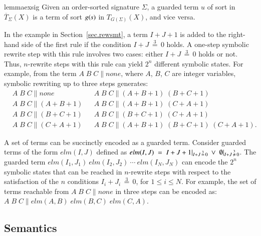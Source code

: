 \begin{restatable}{lemma}{exsig}
\label{lemma:exsig}
Given an order-sorted signature $\Sigma$, a guarded term $u$ of sort
 in $\overline{T}_{\Sigma}(X)$ is a term of sort $g(\textit{s})$
in $T_{G(\Sigma)}(X)$, and vice versa.
\end{restatable}


\begin{example}\label{ex:syntax}
In the example in Section~\ref{sec.rewsmt}, a term $I + J
+ 1$ is added to the right-hand side of the first rule if the
condition $I + J \,\stackrel{\scriptscriptstyle 3}{=}\, 0$ holds. A
one-step symbolic rewrite step with this rule involves two cases:
either $I + J \,\stackrel{\scriptscriptstyle 3}{=}\, 0$ holds or
not. Thus, $n$-rewrite steps with this rule can yield $2^n$ different
symbolic states.
%
For example,
from the term $A\;B\;C\parallel \mathit{none}$,
where $A$, $B$, $C$ are integer variables,
symbolic rewriting up to three steps generates:
%
\begin{align*}
&
A\;B\;C\parallel \mathit{none}
&&
A\;B\;C\parallel (A + B + 1)\;(B + C + 1)
\\
&
A\;B\;C\parallel (A + B + 1)
&&
A\;B\;C\parallel (A + B + 1)\;(C + A + 1)
\\
&
A\;B\;C\parallel (B + C + 1)
&&
A\;B\;C\parallel (B + C + 1)\;(C + A + 1)
\\
&
A\;B\;C\parallel (C + A + 1)
&&
A\;B\;C\parallel (A + B + 1)\;(B + C + 1)\;(C + A + 1).
\end{align*}

A set of terms can be succinctly encoded as a guarded term.
Consider guarded terms of the form $\mathit{elm}(I,J)$ defined as
$\mathit{elm}(I,J) \;=\; I + J + 1 |\usub{I + J \,\stackrel{3}{=}\, 0}
\;\vee\; \emptyset |\usub{I + J \,\stackrel{3}{\not=}\, 0}$.  
The
guarded term
$\mathit{elm}(I_1,J_1)\ \mathit{elm}(I_2,J_2)\ \cdots\ \mathit{elm}(I_N,
J_N)$ can encode the $2^n$ symbolic states that can be reached in
$n$-rewrite steps with respect to the satisfaction of the $n$
conditions $I_i + J_i \,\stackrel{\scriptscriptstyle 3}{=}\, 0$, for
$1 \leq i \leq N$.
%
For example, the set of terms reachable from $A\;B\;C\parallel
\mathit{none}$ in three steps can be encoded as:
$A\;B\;C\parallel
\mathit{elm}(A,B)\;\mathit{elm}(B,C)\;\mathit{elm}(C,A)$.
\end{example}


\subsection{Semantics}

